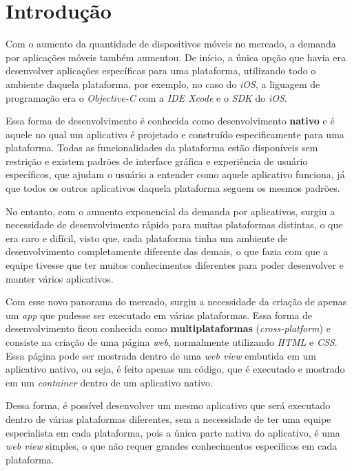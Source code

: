 \chapter{Introdução} \label{cap:introducao}

Com o aumento da quantidade de dispositivos móveis no mercado, a demanda por aplicações móveis também aumentou.
De início, a única opção que havia era desenvolver aplicações específicas para uma plataforma, utilizando todo o ambiente daquela plataforma, por exemplo,
no caso do \textit{iOS}, a liguagem de programação era o \textit{Objective-C} com a \textit{IDE Xcode} e o \textit{SDK} do \textit{iOS}.


Essa forma de desenvolvimento é conhecida como desenvolvimento \textbf{nativo} e é aquele no qual um aplicativo é projetado e construído especificamente para uma plataforma. 
Todas as funcionalidades da plataforma estão disponíveis sem restrição e existem padrões de interface gráfica e experiência de usuário específicos, que ajudam o usuário a 
entender como aquele aplicativo funciona, já que todos os outros aplicativos daquela plataforma seguem os mesmos padrões. 


No entanto, com o aumento exponencial da demanda por aplicativos, surgiu a necessidade de desenvolvimento rápido para muitas plataformas distintas, o que era caro e difícil,
visto que, cada plataforma tinha um ambiente de desenvolvimento completamente diferente das demais, o que fazia com que a equipe tivesse que ter muitos conhecimentos diferentes
para poder desenvolver e manter vários aplicativos.  


Com esse novo panorama do mercado, surgiu a necessidade da criação de apenas um \textit{app} que pudesse ser executado em várias plataformas. Essa forma de desenvolvimento ficou conhecida como 
\textbf{multiplataformas} (\textit{cross-platform}) e consiste na criação de uma página \textit{web}, 
normalmente utilizando \textit{HTML} e \textit{CSS}. Essa página pode ser mostrada dentro de uma \textit{web view}%
embutida em um aplicativo nativo, ou seja, é feito apenas um código, que é executado e mostrado em um \textit{container} dentro de um aplicativo nativo. 


Dessa forma, é possível desenvolver um mesmo aplicativo que será executado dentro de várias plataformas diferentes, sem a necessidade de ter uma equipe especialista em cada plataforma, pois a única 
parte nativa do aplicativo, é uma \textit{web view} simples, o que não requer grandes conhecimentos específicos em cada plataforma.


